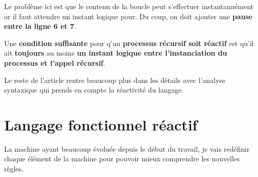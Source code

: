 \documentclass[10pt,a4paper]{article}
\begin{document}
				Le probl\`{e}me ici est que le contenu de la boucle peut s'effectuer instantann\'{e}ment or il faut attendre un instant logique pour. Du coup, on doit ajouter une \textbf{pause entre la ligne 6 et 7}.
				\bigbreak
				
				Une \textbf{condition suffisante} pour q'un \textbf{processus r\'{e}cursif soit r\'{e}actif} est qu'il ait \textbf{toujours} au moins \textbf{un instant logique entre l'instanciation du processus et l'appel r\'{e}cursif}.
				\bigbreak
				
				Le reste de l'article rentre beaucoup plus dans les détails avec l'analyse syntaxique qui prends en compte la réactivité du langage.
		
			\newpage
			
			
		
					\newpage
		\section{Langage fonctionnel réactif}\label{SECDConc4}
			La machine ayant beaucoup évoluée depuis le début du travail, je vais redéfinir chaque élément de la machine pour pouvoir mieux comprendre les nouvelles règles.
		\bigbreak
		
\end{document}
